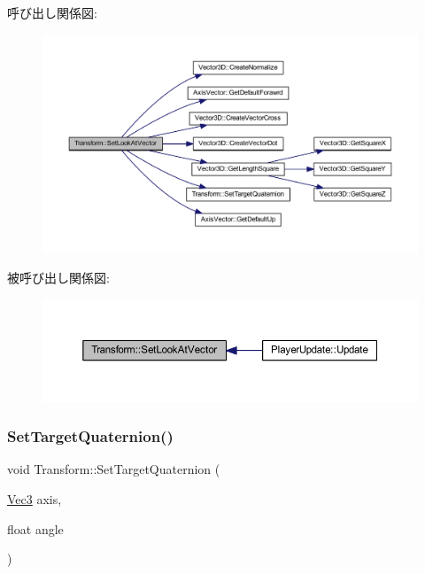 呼び出し関係図\+:\nopagebreak
\begin{figure}[H]
\begin{center}
\leavevmode
\includegraphics[width=350pt]{class_transform_a39b78acbdbf3ee98cad0c4e640988745_cgraph}
\end{center}
\end{figure}
被呼び出し関係図\+:\nopagebreak
\begin{figure}[H]
\begin{center}
\leavevmode
\includegraphics[width=350pt]{class_transform_a39b78acbdbf3ee98cad0c4e640988745_icgraph}
\end{center}
\end{figure}
\mbox{\label{class_transform_ac8cdb5ca9995d9c124f1890d84c92ab4}} 
\subsubsection{\texorpdfstring{Set\+Target\+Quaternion()}{SetTargetQuaternion()}}
{\footnotesize\ttfamily void Transform\+::\+Set\+Target\+Quaternion (\begin{DoxyParamCaption}\item[{\mbox{\hyperlink{_vector3_d_8h_ab16f59e4393f29a01ec8b9bbbabbe65d}{Vec3}}}]{axis,  }\item[{float}]{angle }\end{DoxyParamCaption})}



